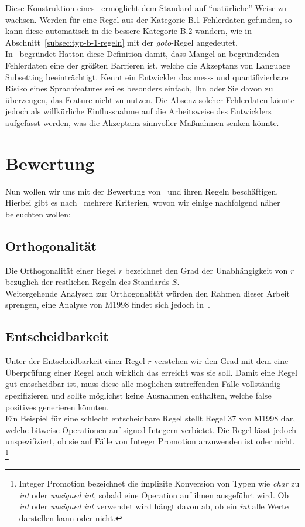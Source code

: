 \documentclass[a4paper,UKenglish,cleveref, autoref]{templates/lipics-v2019}
\begin{document}
    Diese Konstruktion eines \slss\ ermöglicht dem Standard auf \enquote{natürliche} Weise zu wachsen.
    Werden für eine Regel aus der Kategorie B.1 Fehlerdaten gefunden, so kann diese automatisch in die bessere Kategorie
    B.2 wandern, wie in Abschnitt~\ref{subsec:typ-b-1-regeln} mit der \textit{goto}-Regel angedeutet.\\
    In~\cite{hatton2004safer} begründet Hatton diese Definition damit, dass Mangel an begründenden Fehlerdaten eine der
    größten Barrieren ist, welche die Akzeptanz von Language Subsetting beeinträchtigt.
    Kennt ein Entwickler das mess- und quantifizierbare Risiko eines Sprachfeatures sei es besonders einfach, Ihn oder Sie
    davon zu überzeugen, das Feature nicht zu nutzen.
    Die Absenz solcher Fehlerdaten könnte jedoch als willkürliche Einflussnahme auf die Arbeitsweise des Entwicklers
    aufgefasst werden, was die Akzeptanz sinnvoller Maßnahmen senken könnte.
    
    \section{Bewertung}
    \label{sec:bewertung}

    Nun wollen wir uns mit der Bewertung von \sqss\ und ihren Regeln beschäftigen.
    Hierbei gibt es nach~\cite{hatton2004safer} mehrere Kriterien, wovon wir einige nachfolgend näher beleuchten wollen:

    \subsection{Orthogonalität}
    \label{subsec:orthogonalität}
    Die Orthogonalität einer Regel $r$ bezeichnet den Grad der Unabhängigkeit von $r$ bezüglich der restlichen Regeln
    des Standards $S$.\\
    Weitergehende Analysen zur Orthogonalität würden den Rahmen dieser Arbeit sprengen, eine Analyse von M1998 findet sich
    jedoch in~\cite{hatton2004safer}.

    \subsection{Entscheidbarkeit}
    \label{subsec:entscheidbarkeit}
    Unter der Entscheidbarkeit einer Regel $r$ verstehen wir den Grad mit dem eine Überprüfung einer Regel auch wirklich das
    erreicht was sie soll.
    Damit eine Regel gut entscheidbar ist, muss diese alle möglichen zutreffenden Fälle vollständig spezifizieren und
    sollte möglichst keine Ausnahmen enthalten, welche false positives generieren könnten.\\
    Ein Beispiel für eine schlecht entscheidbare Regel stellt Regel 37 von M1998 dar, welche bitweise Operationen auf
    signed Integern verbietet.
    Die Regel lässt jedoch unspezifiziert, ob sie auf Fälle von Integer Promotion anzuwenden ist oder nicht.
    \footnote{Integer Promotion bezeichnet die implizite Konversion von Typen wie \textit{char} zu \textit{int} oder \textit{unsigned int}, sobald eine Operation auf ihnen ausgeführt wird.
    Ob \textit{int} oder \textit{unsigned int} verwendet wird hängt davon ab, ob ein \textit{int} alle Werte darstellen
    kann oder nicht.}
\end{document}
